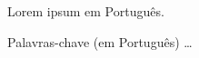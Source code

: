 



Lorem ipsum em Português.


\begin{keywords}
Palavras-chave (em Português) \ldots
\end{keywords}

